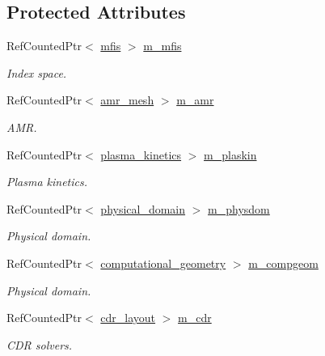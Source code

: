 \subsection*{Protected Attributes}
\begin{DoxyCompactItemize}
\item 
Ref\+Counted\+Ptr$<$ \hyperlink{classmfis}{mfis} $>$ \hyperlink{classtime__stepper_ac45b323d83c4085b3f704bf8ee7b9056}{m\+\_\+mfis}
\begin{DoxyCompactList}\small\item\em Index space. \end{DoxyCompactList}\item 
Ref\+Counted\+Ptr$<$ \hyperlink{classamr__mesh}{amr\+\_\+mesh} $>$ \hyperlink{classtime__stepper_a2ff2fb25e4e79b742d10d490d4296b6a}{m\+\_\+amr}
\begin{DoxyCompactList}\small\item\em A\+MR. \end{DoxyCompactList}\item 
Ref\+Counted\+Ptr$<$ \hyperlink{classplasma__kinetics}{plasma\+\_\+kinetics} $>$ \hyperlink{classtime__stepper_aa6ac2a0f6cb3c0dcda12cc9cdb6c8cc3}{m\+\_\+plaskin}
\begin{DoxyCompactList}\small\item\em Plasma kinetics. \end{DoxyCompactList}\item 
Ref\+Counted\+Ptr$<$ \hyperlink{classphysical__domain}{physical\+\_\+domain} $>$ \hyperlink{classtime__stepper_a055b9f785dc998fdc4d9a9d6b5896a0b}{m\+\_\+physdom}
\begin{DoxyCompactList}\small\item\em Physical domain. \end{DoxyCompactList}\item 
Ref\+Counted\+Ptr$<$ \hyperlink{classcomputational__geometry}{computational\+\_\+geometry} $>$ \hyperlink{classtime__stepper_a3d0709bd478ebd891e89894c55c5253f}{m\+\_\+compgeom}
\begin{DoxyCompactList}\small\item\em Physical domain. \end{DoxyCompactList}\item 
Ref\+Counted\+Ptr$<$ \hyperlink{classcdr__layout}{cdr\+\_\+layout} $>$ \hyperlink{classtime__stepper_a21f779561ea34ed6f6785fc25d8934d0}{m\+\_\+cdr}
\begin{DoxyCompactList}\small\item\em C\+DR solvers. \end{DoxyCompactList}\item 

\end{DoxyCompactItemize}

